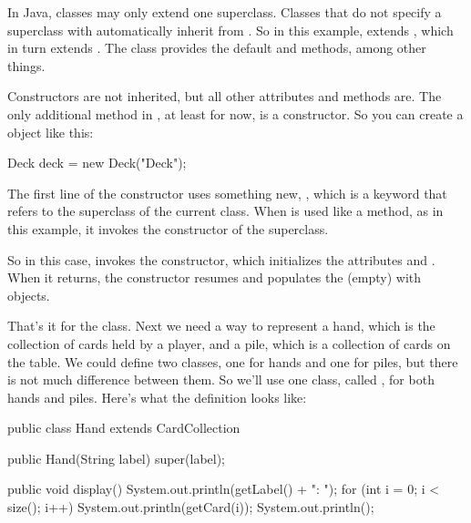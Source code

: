 

In Java, classes may only extend one superclass.
Classes that do not specify a superclass with  automatically inherit from .
So in this example,  extends , which in turn extends .
The  class provides the default  and  methods, among other things.

Constructors are not inherited, but all other  attributes and methods are.
The only additional method in , at least for now, is a constructor.
So you can create a  object like this:

\begin{code}
Deck deck = new Deck("Deck");
\end{code}


The first line of the constructor uses something new, , which is a keyword that refers to the superclass of the current class.
When  is used like a method, as in this example, it invokes the constructor of the superclass.


So in this case,  invokes the  constructor, which initializes the attributes  and .
When it returns, the  constructor resumes and populates the (empty)  with  objects.

That's it for the  class.
Next we need a way to represent a hand, which is the collection of cards held by a player, and a pile, which is a collection of cards on the table.
We could define two classes, one for hands and one for piles, but there is not much difference between them.
So we'll use one class, called , for both hands and piles.
Here's what the definition looks like:

\begin{code}
public class Hand extends CardCollection {

    public Hand(String label) {
        super(label);
    }

    public void display() {
        System.out.println(getLabel() + ": ");
        for (int i = 0; i < size(); i++) {
            System.out.println(getCard(i));
        }
        System.out.println();
    }
}
\end{code}


